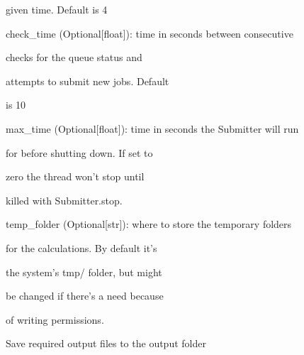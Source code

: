 \documentclass[letterpaper,10pt,english]{sphinxmanual}
\begin{document}
\begin{fulllineitems}
\begin{DUlineblock}{0em}
\begin{DUlineblock}{\DUlineblockindent}
\item[]
\begin{DUlineblock}{\DUlineblockindent}
\item[] given time. Default is 4
\end{DUlineblock}
\item[] check\_time (Optional{[}float{]}): time in seconds between consecutive
\item[]
\begin{DUlineblock}{\DUlineblockindent}
\item[] checks for the queue status and
\item[] attempts to submit new jobs. Default
\item[] is 10
\end{DUlineblock}
\item[] max\_time (Optional{[}float{]}): time in seconds the Submitter will run
\item[]
\begin{DUlineblock}{\DUlineblockindent}
\item[] for before shutting down. If set to
\item[] zero the thread won't stop until
\item[] killed with Submitter.stop.
\end{DUlineblock}
\item[] temp\_folder (Optional{[}str{]}): where to store the temporary folders
\item[]
\begin{DUlineblock}{\DUlineblockindent}
\item[] for the calculations. By default it's
\item[] the system's tmp/ folder, but might
\item[] be changed if there's a need because
\item[] of writing permissions.
\end{DUlineblock}
\end{DUlineblock}
\end{DUlineblock}

\begin{fulllineitems}
\label{doctree/soprano.hpc.submitter.castep:soprano.hpc.submitter.castep.CastepSubmitter.finish_job}
Save required output files to the output folder

\end{fulllineitems}


\end{fulllineitems}
\end{document}
